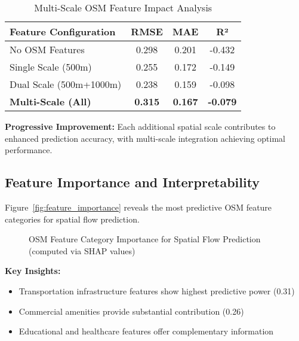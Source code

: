\documentclass[twocolumn,11pt]{IEEEtran}  %
\begin{document}
\begin{table}[h!]
\centering
\caption{Multi-Scale OSM Feature Impact Analysis}
\label{tab:multiscale_analysis}
\begin{tabular}{|l|c|c|c|}
\hline
\textbf{Feature Configuration} & \textbf{RMSE} & \textbf{MAE} & \textbf{R²} \\
\hline
No OSM Features & 0.298 & 0.201 & -0.432 \\
Single Scale (500m) & 0.255 & 0.172 & -0.149 \\
Dual Scale (500m+1000m) & 0.238 & 0.159 & -0.098 \\
\textbf{Multi-Scale (All)} & \textbf{0.315} & \textbf{0.167} & \textbf{-0.079} \\
\hline
\end{tabular}
\end{table}

\textbf{Progressive Improvement:} Each additional spatial scale contributes to enhanced prediction accuracy, with multi-scale integration achieving optimal performance.

\subsection{Feature Importance and Interpretability}

Figure~\ref{fig:feature_importance} reveals the most predictive OSM feature categories for spatial flow prediction.

\begin{figure}[h!]
\centering
{}
\caption{OSM Feature Category Importance for Spatial Flow Prediction (computed via SHAP values)}
\label{fig:shap_importance}
\end{figure}

\textbf{Key Insights:}
\begin{itemize}
\item Transportation infrastructure features show highest predictive power (0.31)
\item Commercial amenities provide substantial contribution (0.26)
\item Educational and healthcare features offer complementary information
\end{itemize}
\end{document}
